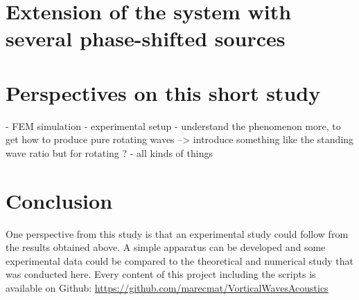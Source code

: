 \documentclass[%
 reprint,
 amsmath,amssymb,
 aip,
]{revtex4-1}
\begin{document}
\section{Extension of the system with several phase-shifted sources}

\section{Perspectives on this short study}
- FEM simulation
- experimental setup
- understand the phenomenon more, to get how to produce pure rotating waves --> introduce something like the standing wave ratio but for rotating ?
- all kinds of things

\section{Conclusion}
One perspective from this study is that an experimental study could follow from the results obtained above. A simple apparatus can be developed and some experimental data could be compared to the theoretical and numerical study that was conducted here. Every content of this project including the scripts is available on Github: \url{https://github.com/marecmat/VorticalWavesAcoustics}


\end{document}
